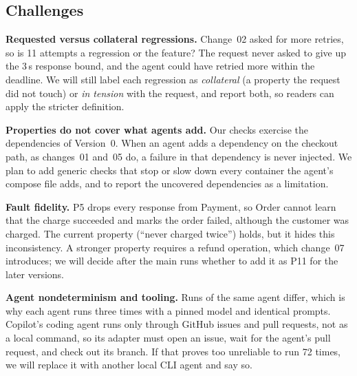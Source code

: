 \subsection{Challenges}
\label{sec:challenges}

\textbf{Requested versus collateral regressions.} Change~02 asked for more retries, so is 11 attempts
a regression or the feature? The request never asked to give up the 3\,s response bound, and
the agent could have retried more within the deadline. We will still label each regression as
\emph{collateral} (a property the request did not touch) or \emph{in tension} with the request,
and report both, so readers can apply the stricter definition.

\textbf{Properties do not cover what agents add.} Our checks exercise the dependencies of Version~0.
When an agent adds a dependency on the checkout path, as changes~01 and~05 do, a failure in that
dependency is never injected. We plan to add generic checks that stop or slow down every
container the agent's compose file adds, and to report the uncovered dependencies as a limitation.

\textbf{Fault fidelity.} P5 drops every response from Payment, so Order cannot learn that the charge
succeeded and marks the order failed, although the customer was charged. The current property
(``never charged twice'') holds, but it hides this inconsistency. A stronger property requires a
refund operation, which change~07 introduces; we will decide after the main runs whether to add it
as P11 for the later versions.

\textbf{Agent nondeterminism and tooling.} Runs of the same agent differ, which is why each agent runs
three times with a pinned model and identical prompts. Copilot's coding agent runs only through
GitHub issues and pull requests, not as a local command, so its adapter must open an issue, wait
for the agent's pull request, and check out its branch. If that proves too unreliable to run
72 times, we will replace it with another local CLI agent and say so.
